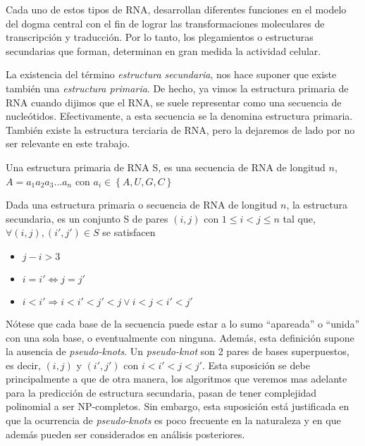 Cada uno de estos tipos de \ac{RNA}, desarrollan diferentes funciones en el
modelo del dogma central con el fin de lograr las transformaciones moleculares
de transcripci\'on y traducci\'on. Por lo tanto, los plegamientos o estructuras
secundarias que forman, determinan en gran medida la actividad celular.

La existencia del t\'ermino \textit{estructura secundaria}, nos hace suponer que
existe tambi\'en una \textit{estructura primaria}. De hecho, ya vimos la
estructura primaria de \ac{RNA} cuando dijimos que el \ac{RNA}, se suele
representar como una secuencia de nucle\'otidos. Efectivamente, a esta secuencia
se la denomina estructura primaria. Tambi\'en existe la estructura terciaria de
\ac{RNA}, pero la dejaremos de lado por no ser relevante en este trabajo.

\begin{definition}
\label{rna_primary}
Una estructura primaria de \ac{RNA} S, es una secuencia de \ac{RNA} de longitud
$n$, $A=a_{1}a_{2}a_{3}\dots a_{n}$ con $a_{i} \in \left\lbrace A, U, G, C
\right\rbrace$ 
\end{definition}

\begin{definition}
\label{rna_secondary}
Dada una estructura primaria o secuencia de \ac{RNA} de longitud $n$, la
estructura secundaria, es un conjunto S de pares $(i,j)$ con $1\leq i < j \leq
n$ tal que, $\forall (i,j), (i',j') \in S$ se satisfacen
\begin{itemize}
 \item $j-i > 3$
 \item $i=i' \Leftrightarrow j=j'$
 \item $i< i'\Rightarrow i < i' < j' < j \lor i < j < i' < j'$ 
\end{itemize}
\end{definition}

N\'otese que cada base de la secuencia puede estar a lo sumo ``apareada'' o
``unida'' con una sola base, o eventualmente con ninguna. Adem\'as, esta
definici\'on supone la ausencia de \textit{pseudo-knots}. Un
\textit{pseudo-knot} son 2 pares de bases superpuestos, es decir, $(i,j)$ y
$(i',j')$ con $i < i' < j < j'$. Esta suposici\'on se debe principalmente a que
de otra manera, los algoritmos que veremos mas adelante para la predicci\'on de
estructura secundaria, pasan de tener complejidad polinomial a ser
NP-completos\cite{Lyngso00}. Sin embargo, esta suposici\'on est\'a justificada
en que la ocurrencia de \textit{pseudo-knots} es poco frecuente en la
naturaleza y en que adem\'as pueden ser considerados en an\'alisis
posteriores\cite{Zuker84}.

